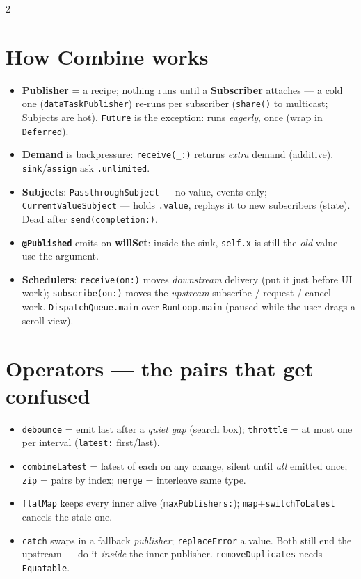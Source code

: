 \documentclass[8pt]{extarticle}
\begin{document}
\begin{multicols}{2}
\section{How Combine works}
\begin{itemize}
  \item \textbf{Publisher} = a recipe; nothing runs until a \textbf{Subscriber} attaches
        — a cold one (\texttt{dataTaskPublisher}) re-runs per subscriber
        (\texttt{share()} to multicast; Subjects are hot).
        \texttt{Future} is the exception: runs \emph{eagerly}, once
        (wrap in \texttt{Deferred}).
  \item \textbf{Demand} is backpressure: \texttt{receive(\_:)} returns \emph{extra}
        demand (additive). \texttt{sink}/\texttt{assign} ask \texttt{.unlimited}.
  \item \textbf{Subjects}: \texttt{PassthroughSubject} — no value, events only;
        \texttt{CurrentValueSubject} — holds \texttt{.value}, replays it to new
        subscribers (state). Dead after \texttt{send(completion:)}.
  \item \textbf{\texttt{@Published}} emits on \textbf{willSet}: inside the sink,
        \texttt{self.x} is still the \emph{old} value — use the argument.
  \item \textbf{Schedulers}: \texttt{receive(on:)} moves \emph{downstream} delivery
        (put it just before UI work); \texttt{subscribe(on:)} moves the
        \emph{upstream} subscribe / request / cancel work. \texttt{DispatchQueue.main}
        over \texttt{RunLoop.main} (paused while the user drags a scroll view).
\end{itemize}

\section{Operators — the pairs that get confused}
\begin{itemize}
  \item \texttt{debounce} = emit last after a \emph{quiet gap} (search box);
        \texttt{throttle} = at most one per interval (\texttt{latest:} first/last).
  \item \texttt{combineLatest} = latest of each on any change, silent until
        \emph{all} emitted once; \texttt{zip} = pairs by index; \texttt{merge} =
        interleave same type.
  \item \texttt{flatMap} keeps every inner alive (\texttt{maxPublishers:});
        \texttt{map}+\texttt{switchToLatest} cancels the stale one.
  \item \texttt{catch} swaps in a fallback \emph{publisher}; \texttt{replaceError}
        a value. Both still end the upstream — do it \emph{inside} the inner
        publisher. \texttt{removeDuplicates} needs \texttt{Equatable}.
\end{itemize}


\end{multicols}
\end{document}
